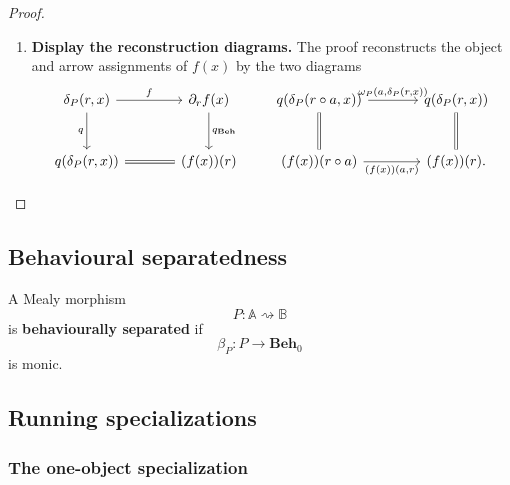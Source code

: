 \begin{proof}
\begin{enumerate}
        \item \textbf{Display the reconstruction diagrams.} The proof reconstructs the object and arrow assignments of \(f(x)\) by the two diagrams
        \[
            \begin{tikzcd}[column sep=large, row sep=large]
                    \delta_P(r,x)
                        \arrow[r, "f"]
                        \arrow[d, "q"']
                &
                    \partial_r f(x)
                        \arrow[d, "q_{\mathbf{Beh}}"]
                \\
                    q(\delta_P(r,x))
                        \arrow[r, equal]
                &
                    (f(x))(r)
            \end{tikzcd}
            \qquad
            \begin{tikzcd}[column sep=large, row sep=large]
                    q(\delta_P(r\circ a,x))
                        \arrow[r, "{\omega_P(a,\delta_P(r,x))}"]
                        \arrow[d, equal]
                &
                    q(\delta_P(r,x))
                        \arrow[d, equal]
                \\
                    (f(x))(r\circ a)
                        \arrow[r, "{(f(x))(a,r)}"']
                &
                    (f(x))(r).
            \end{tikzcd}
        \]
    \end{enumerate}
\end{proof}

\subsection{Behavioural separatedness}
\label{subsec:behavioural-separatedness}

\begin{definition}
\label{def:behavioural-separatedness}
    A Mealy morphism
    \[
        P:\mathbb A\rightsquigarrow\mathbb B
    \]
    is \textbf{behaviourally separated} if
    \[
        \beta_P:P\to\mathbf{Beh}_0
    \]
    is monic.
\end{definition}

\subsection{Running specializations}
\label{subsec:terminal-running-specializations}

\subsubsection{The one-object specialization}

